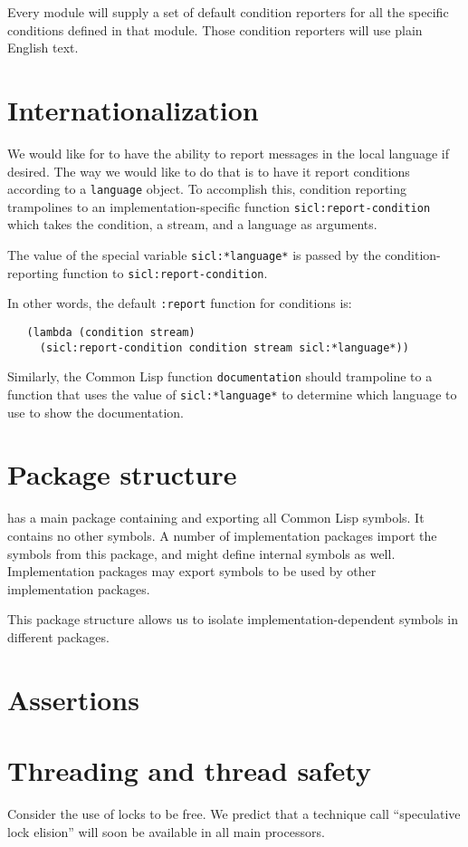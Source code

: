 Every \sysname{} module will supply a set of default condition
reporters for all the specific conditions defined in that module.
Those condition reporters will use plain English text. 

\section{Internationalization}

We would like for {\sysname} to have the ability to report messages in
the local language if desired.  The way we would like to do that is to
have it report conditions according to a \texttt{language} object.  To
accomplish this, condition reporting trampolines to an
implementation-specific function \texttt{sicl:report-condition} which
takes the condition, a stream, and a language as arguments.

The value of the special variable \texttt{sicl:*language*} is passed
by the condition-reporting function to \texttt{sicl:report-condition}.

In other words, the default \texttt{:report} function for conditions is:

\begin{verbatim}
   (lambda (condition stream) 
     (sicl:report-condition condition stream sicl:*language*))
\end{verbatim}

Similarly, the Common Lisp function \texttt{documentation} should
trampoline to a function that uses the value of
\texttt{sicl:*language*} to determine which language to use to show
the documentation. 

\section{Package structure}

{\sysname} has a main package containing and exporting all Common Lisp
symbols.  It contains no other symbols.  A number of implementation
packages import the symbols from this package, and might define
internal symbols as well.  Implementation packages may export symbols
to be used by other implementation packages.

This package structure allows us to isolate implementation-dependent
symbols in different packages.  

\section{Assertions}

\section{Threading and thread safety}

Consider the use of locks to be free.  We predict that a technique
call ``speculative lock elision'' will soon be available in all main
processors.

